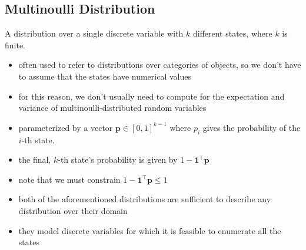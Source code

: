 \documentclass[11pt, twocolumn]{report}
\begin{document}
\subsection{Multinoulli Distribution}
A distribution over a single discrete variable with $k$ different states, where
$k$ is finite.
\begin{itemize}
  \item often used to refer to distributions over categories of objects, so we
    don't have to assume that the states have numerical values
  \item for this reason, we don't usually need to compute for the expectation
    and variance of multinoulli-distributed random variables
  \item parameterized by a vector $\bm{p} \in [0, 1]^{k - 1}$ where $p_i$ gives
    the probability of the $i$-th state.
  \item the final, $k$-th state's probability is given by $1 -
    \bm{1}^\intercal\bm{p}$
  \item note that we must constrain $1 - \bm{1}^\intercal\bm{p} \leq 1$
  \item both of the aforementioned distributions are sufficient to describe any
    distribution over their domain
  \item they model discrete variables for which it is feasible to enumerate all
    the states
\end{itemize}
\end{document}
